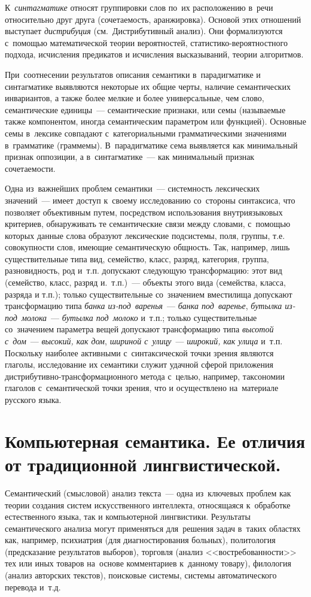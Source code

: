 \documentclass[12pt]{article}
\theoremstyle{definition}
\theoremstyle{remark}
\numberwithin{equation}{section}
\begin{document}
К~{\sl синтагматике} относят группировки слов по~их расположению в~речи
относительно друг друга (сочетаемость, аранжировка). Основой этих отношений
выступает {\sl дистрибуция} (см.~Дистрибутивный анализ). Они формализуются
с~помощью математической теории вероятностей, статистико-вероятностного
подхода, исчисления предикатов и исчисления высказываний, теории алгоритмов.

При~соотнесении результатов описания семантики в~парадигматике и синтагматике
выявляются некоторые их общие черты, наличие семантических инвариантов,
а также более мелкие и более универсальные, чем слово, семантические
единицы~--- семантические признаки, или семы (называемые также компонентом,
иногда семантическим параметром или функцией). Основные семы в~лексике совпадают
с~категориальными грамматическими значениями в~грамматике (граммемы).
В~парадигматике сема выявляется как минимальный признак оппозиции,
а в~синтагматике~--- как минимальный признак сочетаемости.

Одна из~важнейших проблем семантики~--- системность лексических значений~---
имеет доступ к~своему исследованию со~стороны синтаксиса, что позволяет
объективным путем, посредством использования внутриязыковых критериев,
обнаруживать те семантические связи между словами, с~помощью которых данные
слова образуют лексические подсистемы, поля, группы, т.е. совокупности
слов, имеющие семантическую общность. Так, например, лишь существительные
типа вид, семейство, класс, разряд, категория, группа, разновидность, род
и~т.п. допускают следующую трансформацию: этот вид (семейство, класс, разряд
и.~т.п.)~--- объекты этого вида (семейства, класса, разряда и т.п.); только
существительные со~значением вместилища допускают трансформацию типа {\it банка
из-под~варенья}~--- {\it банка под~варенье}, {\it бутылка из-под~молока}~---
{\it бутылка под~молоко} и~т.п.; только существительные со~значением параметра вещей
допускают трансформацию типа {\it высотой с~дом}~--- {\it высокий, как дом},
{\it шириной с~улицу}~--- {\it широкий, как улица} и~т.п. Поскольку наиболее
активными с~синтаксической точки зрения являются глаголы, исследование их
семантики служит удачной сферой приложения дистрибутивно-трансформационного
метода с~целью, например, таксономии глаголов с~семантической точки
зрения, что и осуществлено на~материале русского языка.

\section{Компьютерная семантика. Ее отличия от традиционной лингвистической.}
Семантический (смысловой) анализ текста~--- одна из~ключевых проблем
как теории создания систем искусственного интеллекта, относящаяся
к~обработке естественного языка, так и компьютерной лингвистики.
Результаты семантического анализа могут применяться для~решения задач
в~таких областях как, например, психиатрия (для диагностирования
больных), политология (предсказание результатов выборов), торговля
(анализ <<востребованности>> тех или иных товаров на~основе комментариев
к~данному товару), филология (анализ авторских текстов), поисковые
системы, системы автоматического перевода и~т.д.
\end{document}
